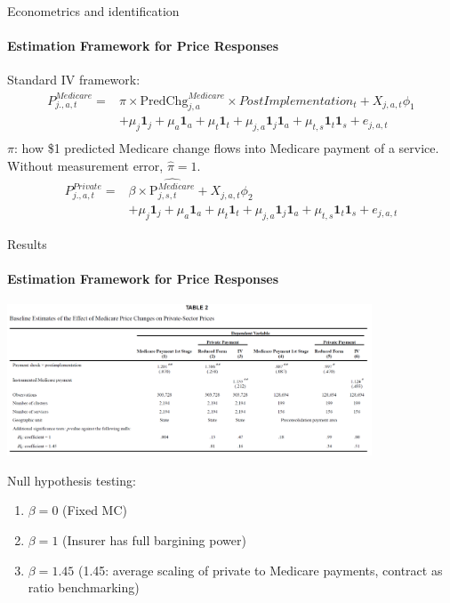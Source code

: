 \documentclass{beamer}
\begin{document}
\begin{frame}{Econometrics and identification}
\framesubtitle{Estimation Framework for Price Responses}
Standard IV framework:
\begin{align*}
P^{Medicare}_{j.,a,t} = &  \pi \times \text{PredChg}_{j,a}^{Medicare} \times PostImplementation_{t} + X_{j,a,t}\phi_1 \\
& + \mu_j \mathbf{1}_j + \mu_a \mathbf{1}_a +  \mu_t \mathbf{1}_t + \mu_{j,a} \mathbf{1}_j\mathbf{1}_a + \mu_{t,s} \mathbf{1}_t\mathbf{1}_s + e_{j,a,t} \\
\end{align*}
$\pi$: how \$1 predicted Medicare change flows into Medicare payment of a service. Without measurement error, $\hat{\pi} = 1$.
\begin{align*}
P^{Private}_{j.,a,t} = &  \beta \times \widehat{\text{P}_{j,s,t}^{Medicare}} + X_{j,a,t}\phi_2 \\
& + \mu_j \mathbf{1}_j + \mu_a \mathbf{1}_a +  \mu_t \mathbf{1}_t + \mu_{j,a} \mathbf{1}_j\mathbf{1}_a + \mu_{t,s} \mathbf{1}_t\mathbf{1}_s + e_{j,a,t}
\end{align*}
\end{frame}

\begin{frame}{Results}
\framesubtitle{Estimation Framework for Price Responses}
\begin{center}
\includegraphics[height=4.5cm]{tab2}
\end{center}
Null hypothesis testing:
\begin{enumerate}
\item $\beta = 0$ (Fixed MC)
\item $\beta = 1$ (Insurer has full bargining power)
\item $\beta = 1.45$ (1.45: average scaling of private to Medicare payments, contract as ratio benchmarking)
\end{enumerate}
\end{frame}
\end{document}
